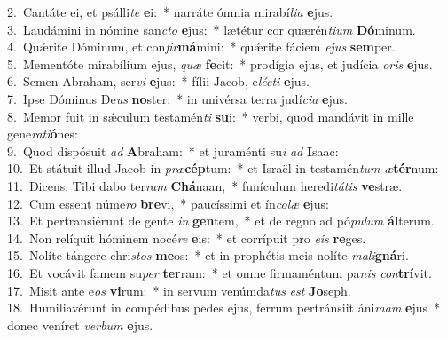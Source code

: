 {2.~}Cantáte ei, et psálli\textit{te} \textbf{e}i:~* narráte ómnia mirabí\textit{li}\textit{a} \textbf{e}jus.\\
{3.~}Laudámini in nómine san\textit{cto} \textbf{e}jus:~* lætétur cor quærén\textit{ti}\textit{um} \textbf{Dó}minum.\\
{4.~}Quǽrite Dóminum, et con\textit{fir}\textbf{má}mini:~* quǽrite fáciem \textit{e}\textit{jus} \textbf{sem}per.\\
{5.~}Mementóte mirabílium ejus, \textit{quæ} \textbf{fe}cit:~* prodígia ejus, et judícia \textit{o}\textit{ris} \textbf{e}jus.\\
{6.~}Semen Abraham, ser\textit{vi} \textbf{e}jus:~* fílii Jacob, e\textit{lé}\textit{cti} \textbf{e}jus.\\
{7.~}Ipse Dóminus De\textit{us} \textbf{no}ster:~* in univérsa terra judí\textit{ci}\textit{a} \textbf{e}jus.\\
{8.~}Memor fuit in sǽculum testamén\textit{ti} \textbf{su}i:~* verbi, quod mandávit in mille gene\textit{ra}\textit{ti}\textbf{ó}nes:\\
{9.~}Quod dispósuit \textit{ad} \textbf{A}braham:~* et juraménti su\textit{i} \textit{ad} \textbf{I}saac:\\
{10.~}Et státuit illud Jacob in \textit{præ}\textbf{cép}tum:~* et Israël in testamén\textit{tum} \textit{æ}\textbf{tér}num:\\
{11.~}Dicens: Tibi dabo ter\textit{ram} \textbf{Chá}naan,~* funículum heredi\textit{tá}\textit{tis} \textbf{ve}stræ.\\
{12.~}Cum essent núme\textit{ro} \textbf{bre}vi,~* paucíssimi et ín\textit{co}\textit{læ} \textbf{e}jus:\\
{13.~}Et pertransiérunt de gente \textit{in} \textbf{gen}tem,~* et de regno ad pó\textit{pu}\textit{lum} \textbf{ál}terum.\\
{14.~}Non relíquit hóminem nocé\textit{re} \textbf{e}is:~* et corrípuit pro \textit{e}\textit{is} \textbf{re}ges.\\
{15.~}Nolíte tángere chri\textit{stos} \textbf{me}os:~* et in prophétis meis nolíte \textit{ma}\textit{li}\textbf{gná}ri.\\
{16.~}Et vocávit famem su\textit{per} \textbf{ter}ram:~* et omne firmaméntum pa\textit{nis} \textit{con}\textbf{trí}vit.\\
{17.~}Misit ante e\textit{os} \textbf{vi}rum:~* in servum venúmda\textit{tus} \textit{est} \textbf{Jo}seph.\\
{18.~}Humiliavérunt in compédibus pedes ejus, ferrum pertránsiit áni\textit{mam} \textbf{e}jus~* donec veníret \textit{ver}\textit{bum} \textbf{e}jus.\\
